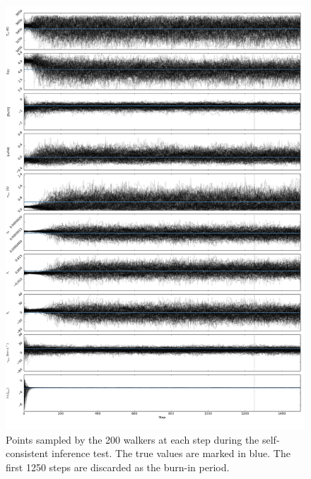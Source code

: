 \documentclass{aastex}
\begin{document}
\begin{figure}
\label{fig:chains}
\includegraphics[height=\textheight]{chains.pdf}
\caption{Points sampled by the 200 walkers at each step during the self-consistent 
inference test. The true values are marked in blue. The first 1250 steps are 
discarded as the burn-in period.}
\end{figure}
\end{document}
